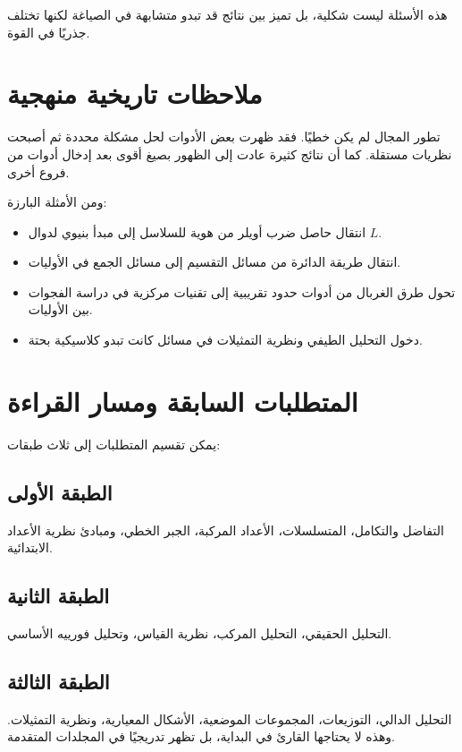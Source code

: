 هذه الأسئلة ليست شكلية، بل تميز بين نتائج قد تبدو متشابهة في الصياغة لكنها تختلف جذريًا في القوة.

\section{ملاحظات تاريخية منهجية}

تطور المجال لم يكن خطيًا. فقد ظهرت بعض الأدوات لحل مشكلة محددة ثم أصبحت نظريات مستقلة. كما أن نتائج كثيرة عادت إلى الظهور بصيغ أقوى بعد إدخال أدوات من فروع أخرى.

ومن الأمثلة البارزة:

\begin{itemize}
  \item انتقال حاصل ضرب أويلر من هوية للسلاسل إلى مبدأ بنيوي لدوال \(L\).
  \item انتقال طريقة الدائرة من مسائل التقسيم إلى مسائل الجمع في الأوليات.
  \item تحول طرق الغربال من أدوات حدود تقريبية إلى تقنيات مركزية في دراسة الفجوات بين الأوليات.
  \item دخول التحليل الطيفي ونظرية التمثيلات في مسائل كانت تبدو كلاسيكية بحتة.
\end{itemize}

\section{المتطلبات السابقة ومسار القراءة}

يمكن تقسيم المتطلبات إلى ثلاث طبقات:

\subsection{الطبقة الأولى}

التفاضل والتكامل، المتسلسلات، الأعداد المركبة، الجبر الخطي، ومبادئ نظرية الأعداد الابتدائية.

\subsection{الطبقة الثانية}

التحليل الحقيقي، التحليل المركب، نظرية القياس، وتحليل فورييه الأساسي.

\subsection{الطبقة الثالثة}

التحليل الدالي، التوزيعات، المجموعات الموضعية، الأشكال المعيارية، ونظرية التمثيلات. وهذه لا يحتاجها القارئ في البداية، بل تظهر تدريجيًا في المجلدات المتقدمة.


